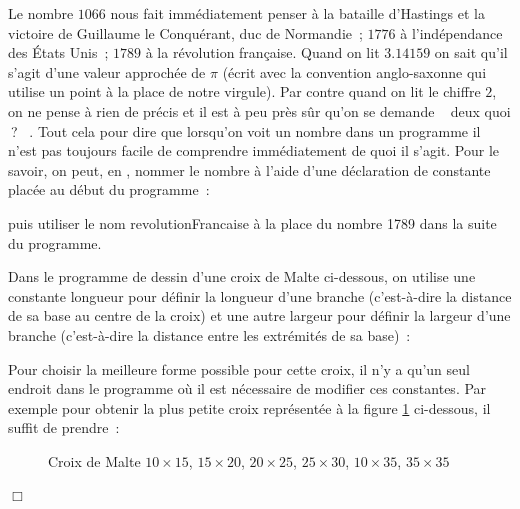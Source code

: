 Le nombre $1066$ nous fait immédiatement penser à la bataille d'Hastings et la victoire de Guillaume le Conquérant, duc de Normandie~;
$1776$  à l'indépendance des États Unis~; $1789$ à la révolution
française. Quand on lit $3.14159$ on sait qu'il s'agit d'une valeur approchée de $\pi$
(écrit avec la convention anglo-saxonne qui utilise un point à la place de notre virgule).
Par contre quand on lit le chiffre $2$, on ne pense à rien de précis et il est à peu près sûr
qu'on se demande
\raisebox{0.25ex}{$\scriptscriptstyle \boldmath\ll$}~%
deux quoi$\:$?%
~\raisebox{0.25ex}{$\scriptscriptstyle \boldmath\gg$}.
Tout cela pour dire que lorsqu'on voit un nombre dans un
programme il n'est pas toujours facile de comprendre immédiatement de quoi il s'agit. Pour le savoir,
on peut, en \python, nommer le nombre à l'aide d'une déclaration de constante placée au
début du programme~:

{
\parindent {}
\medskip

\vspace{\neglskip}\mbox{}\par

\medskip }

\noindent puis utiliser le nom {\idt revolutionFrancaise} à la place du nombre
{\small\rm 1789} dans la suite du programme.


\begin{exemple}{\rm
Dans le programme de dessin d'une croix de Malte ci-dessous, on
utilise une constante {\idt longueur} pour définir la longueur d'une
branche (c'est-à-dire la distance de sa base au centre de la croix) et
une autre {\idt largeur} pour définir la largeur d'une branche
(c'est-à-dire la distance entre les extrémités de sa base)~:\hfill\\[22mm]
%
\vspace*{-22mm}%


Pour choisir la meilleure forme possible pour
cette croix, il n'y a qu'un seul endroit dans le programme où il est nécessaire
de modifier ces constantes. Par exemple pour obtenir la plus petite croix représentée à la
figure \ref{fig:crmadiff} ci-dessous, il suffit de prendre~:\par
{
\parindent {}
\medskip

\vspace{\neglskip}\mbox{}\par
\vspace{\neglskip}\mbox{}\par

\medskip }
\begin{figure}[htbp]
 \caption{Croix de Malte $10\times 15$, $15\times 20$, $20\times 25$, $25\times 30$,
 $10\times 35$, $35\times 35$}
 \label{fig:crmadiff}
\end{figure}
\noindent $\Box$ }\end{exemple}

